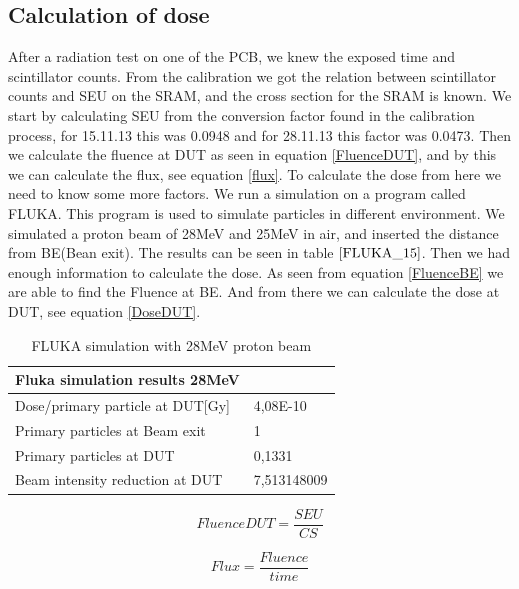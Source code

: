 \documentclass[12pt]{article}
\numberwithin{figure}{section}
\begin{document}
\FloatBarrier

\newpage

\subsection{Calculation of dose}
After a radiation test on one of the PCB, we knew the exposed time and scintillator counts. From the calibration we got the relation between scintillator counts and SEU on the \ac{SRAM}, and the cross section for the SRAM is known. 
We start by calculating SEU from the conversion factor found in the calibration process, for 15.11.13 this was 0.0948 and for 28.11.13 this factor was 0.0473. Then we calculate the fluence at \ac{DUT} as seen in equation \ref{FluenceDUT}, and by this we can calculate the flux, see equation \ref{flux}.
To calculate the dose from here we need to know some more factors. We run a simulation on a program called FLUKA. This program is used to simulate particles in different environment. We simulated a proton beam of 28MeV and 25MeV in air, and inserted the distance from BE(Bean exit). The results can be seen in table $\ref{FLUKA_15}$.
Then we had enough information to calculate the dose. As seen from equation \ref{FluenceBE} we are able to find the Fluence at BE. And from there we can calculate the dose at \ac{DUT}, see equation \ref{DoseDUT}.


\begin{table}[!htbp]
  \centering
    \begin{tabular}{|l|l|} \hline
    Fluka simulation results 28MeV &  \\\hline\hline
    Dose/primary particle at DUT[Gy] & 4,08E-10 \\\hline
    Primary particles at Beam exit & 1 \\\hline
    Primary particles at DUT & 0,1331 \\\hline
    Beam intensity reduction  at DUT & 7,513148009 \\\hline
    \end{tabular}%
      \caption{FLUKA simulation with 28MeV proton beam}
  \label{FLUKA_15}%
\end{table}%


\begin{equation}
FluenceDUT = \frac{SEU}{CS}
\label{FluenceDUT}
\end{equation}

\begin{equation}
Flux = \frac{Fluence}{time}
\label{flux}
\end{equation}
\end{document}
